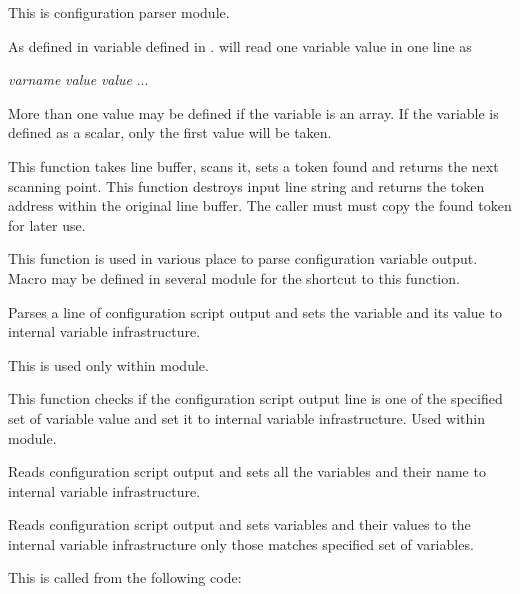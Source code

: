   This is configuration parser module.
  
  As defined in  variable defined in .
      will read one variable value in one line as
  
  \textit{varname} \textit{value} \textit{value} ...
  
  More than one value may be defined if the variable is an array.
  If the variable is defined as a scalar, only the first value will be taken.
  
  
      This function takes line buffer, scans it, sets a token found and returns the next scanning point.
      This function destroys input line string and returns the token address within the original line buffer.
	  The caller must must copy the found token for
      later use.
      
      This function is used in various place to parse configuration variable output.
      Macro  may be defined in several module for the shortcut to 
      this function.
  
  
      Parses a line of configuration script output and sets the variable and its value
      to internal variable infrastructure.
      
      This is used only within  module.
  
  
      This function checks if the configuration script output line is one of the specified set of variable value
      and set it to internal variable infrastructure.
      Used within  module.
  
  
      Reads configuration  script output and sets all the variables and their name
      to internal variable infrastructure.
  
  
      Reads configuration script output and sets variables and their values to the
      internal variable infrastructure only those matches specified set of variables.
      
      This is called from the following code:
      
